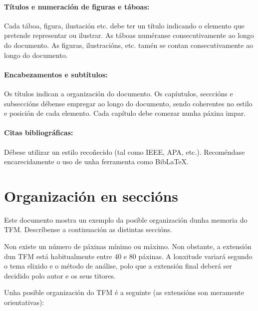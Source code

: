 \paragraph{Títulos e numeración de figuras e táboas:}  Cada táboa, figura, ilustación etc. debe ter un título indicando o elemento que pretende representar ou ilustrar.  As táboas numéranse consecutivamente ao longo do documento. As figuras, ilustracións, etc. tamén se contan consecutivamente ao longo do documento.

\paragraph{Encabezamentos e subtítulos:}     Os títulos indican a organización do documento.     Os capíutulos, secccións e subseccións débense empregar ao longo do documento, sendo coherentes no estilo e posición de cada elemento.  Cada capítulo debe comezar nunha páxina impar. 

\paragraph{Citas bibliográficas:} Débese utilizar un estilo recoñecido (tal como IEEE, APA, etc.). Recoméndase encarecidamente o uso de unha ferramenta como BibLaTeX. 


\section{Organización en seccións}
\label{sec:organización}

Este documento mostra un exemplo da posible organización dunha memoria do TFM. Descríbense a continuación as distintas seccións. 

Non existe un número de páxinas mínimo ou máximo. Non obstante, a extensión dun TFM está habitualmente entre 40 e 80 páxinas. A lonxitude variará segundo o tema elixido e o método de análise, polo que a extensión final deberá ser decidido polo autor e os seus titores. 

Unha posible organización do TFM é a seguinte (as extensións son meramente orientativas): 

